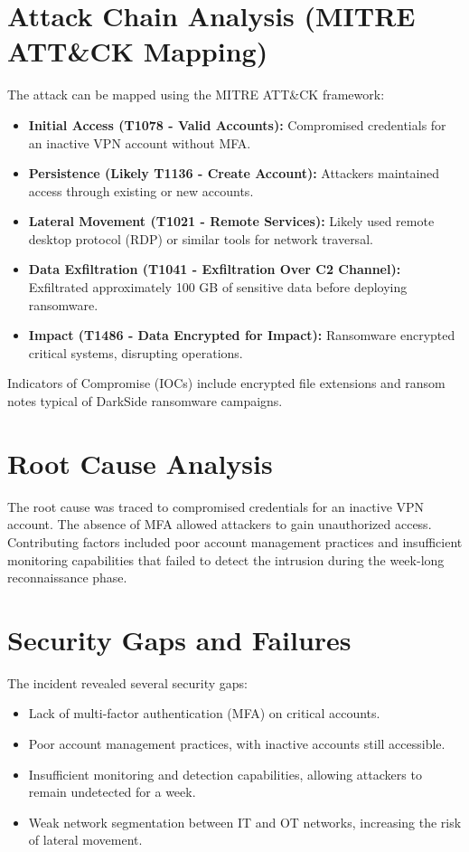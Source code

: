 \documentclass[11pt]{article}
\begin{document}
\section{Attack Chain Analysis (MITRE ATT\&CK Mapping)}
The attack can be mapped using the MITRE ATT\&CK framework:
\begin{itemize}
    \item \textbf{Initial Access (T1078 - Valid Accounts):} Compromised credentials for an inactive VPN account without MFA.
    \item \textbf{Persistence (Likely T1136 - Create Account):} Attackers maintained access through existing or new accounts.
    \item \textbf{Lateral Movement (T1021 - Remote Services):} Likely used remote desktop protocol (RDP) or similar tools for network traversal.
    \item \textbf{Data Exfiltration (T1041 - Exfiltration Over C2 Channel):} Exfiltrated approximately 100 GB of sensitive data before deploying ransomware.
    \item \textbf{Impact (T1486 - Data Encrypted for Impact):} Ransomware encrypted critical systems, disrupting operations.
\end{itemize}

Indicators of Compromise (IOCs) include encrypted file extensions and ransom notes typical of DarkSide ransomware campaigns.

\section{Root Cause Analysis}
The root cause was traced to compromised credentials for an inactive VPN account. The absence of MFA allowed attackers to gain unauthorized access. Contributing factors included poor account management practices and insufficient monitoring capabilities that failed to detect the intrusion during the week-long reconnaissance phase.

\section{Security Gaps and Failures}
The incident revealed several security gaps:
\begin{itemize}
    \item Lack of multi-factor authentication (MFA) on critical accounts.
    \item Poor account management practices, with inactive accounts still accessible.
    \item Insufficient monitoring and detection capabilities, allowing attackers to remain undetected for a week.
    \item Weak network segmentation between IT and OT networks, increasing the risk of lateral movement.
\end{itemize}
\end{document}
